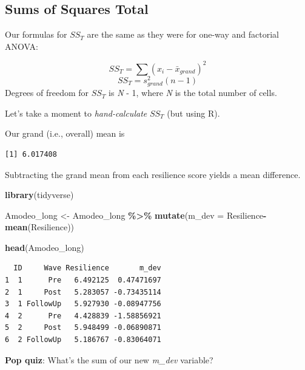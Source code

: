 \documentclass[
  11pt,
]{book}
\newenvironment{Shaded}{\begin{snugshade}}{\end{snugshade}}
\newcommand{\AttributeTok}[1]{\textcolor[rgb]{0.27,0.27,0.27}{#1}}
\newcommand{\FunctionTok}[1]{\textcolor[rgb]{0.27,0.27,0.27}{\textbf{#1}}}
\newcommand{\NormalTok}[1]{#1}
\newcommand{\OtherTok}[1]{\textcolor[rgb]{0.37,0.37,0.37}{#1}}
\newcommand{\SpecialCharTok}[1]{\textcolor[rgb]{0.43,0.43,0.43}{\textbf{#1}}}
\begin{document}
\hypertarget{sums-of-squares-total-2}{%
\subsection{Sums of Squares Total}\label{sums-of-squares-total-2}}

Our formulas for \(SS_{T}\) are the same as they were for one-way and factorial ANOVA:

\[SS_{T}= \sum (x_{i}-\bar{x}_{grand})^{2}\] \[SS_{T}= s_{grand}^{2}(n-1)\] Degrees of freedom for \(SS_T\) is \emph{N} - 1, where \emph{N} is the total number of cells.

Let's take a moment to \emph{hand-calculate} \(SS_{T}\) (but using R).

Our grand (i.e., overall) mean is

\begin{Shaded}
\end{Shaded}

\begin{verbatim}
[1] 6.017408
\end{verbatim}

Subtracting the grand mean from each resilience score yields a mean difference.

\begin{Shaded}
\begin{Highlighting}[]
\FunctionTok{library}\NormalTok{(tidyverse)}

\NormalTok{Amodeo\_long }\OtherTok{\textless{}{-}}\NormalTok{ Amodeo\_long }\SpecialCharTok{\%\textgreater{}\%} 
  \FunctionTok{mutate}\NormalTok{(}\AttributeTok{m\_dev =}\NormalTok{ Resilience}\SpecialCharTok{{-}}\FunctionTok{mean}\NormalTok{(Resilience))}

\FunctionTok{head}\NormalTok{(Amodeo\_long)}
\end{Highlighting}
\end{Shaded}

\begin{verbatim}
  ID     Wave Resilience       m_dev
1  1      Pre   6.492125  0.47471697
2  1     Post   5.283057 -0.73435114
3  1 FollowUp   5.927930 -0.08947756
4  2      Pre   4.428839 -1.58856921
5  2     Post   5.948499 -0.06890871
6  2 FollowUp   5.186767 -0.83064071
\end{verbatim}

\textbf{Pop quiz}: What's the sum of our new \emph{m\_dev} variable?
\end{document}
